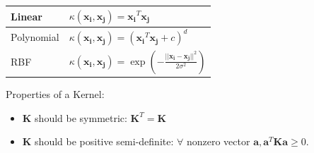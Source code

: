 \documentclass[10pt,a4paper,landscape]{article}
\renewcommand{\bf}[1]{\ensuremath{\mathbf{#1}}}
\begin{document}
\begin{multicols*}{4}


\begin{tabular}{ l | l }
  \hline
  Linear     & $\kappa(\bf{x_i}, \bf{x_j}) = \bf{x_i}^T \bf{x_j}$ \\
  \hline
  Polynomial & $\kappa(\bf{x_i}, \bf{x_j}) = (\bf{x_i}^T \bf{x_j} + c)^d$ \\
  \hline
  RBF        & $\kappa(\bf{x_i}, \bf{x_j}) = \exp\left(-\frac{||\bf{x_i} - \bf{x_j}||^2}{2\sigma^2}\right)$ \\
  \hline
\end{tabular}

Properties of a Kernel:
\begin{itemize}
\item $\bf{K}$ should be symmetric: $\bf{K}^T = \bf{K}$
\item $\bf{K}$ should be positive semi-definite: $\forall$ nonzero vector $\bf{a}, \bf{a}^T \bf{K} \bf{a} \geq 0$.
\end{itemize}

%
%
%
%


\end{multicols*}
\end{document}

